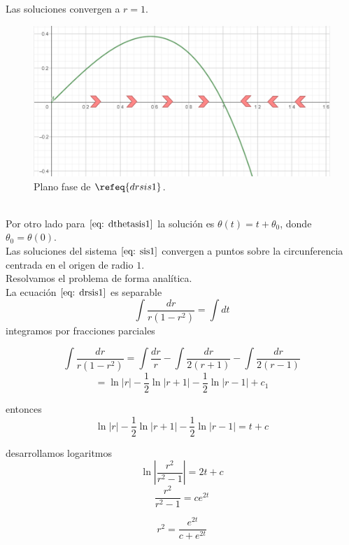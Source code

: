 \documentclass[12pt, a4paper]{report}
\begin{document}
Las soluciones convergen a $r=1$.
\begin{figure}[h]
	\centering
	\includegraphics[width=14cm]{rej1.png}
	\caption{Plano fase de $\refeq{drsis1}$.}
\end{figure}\\

Por otro lado para $\eqref{eq: dthetasis1}$ la solución es $\theta(t)=t+\theta_0$,
donde $\theta_0=\theta(0)$.\\

Las soluciones del sistema $\eqref{eq: sis1}$ convergen a puntos sobre la
circunferencia centrada en el origen de radio $1$.\\

Resolvamos el problema de forma analítica.\\

La ecuación $\eqref{eq: drsis1}$ es separable
$$\int\frac{dr}{r(1-r^2)}=\int dt$$
integramos por fracciones parciales

$$\int\frac{dr}{r(1-r^2)}=\int\frac{dr}{r}-\int\frac{dr}{2(r+1)}-\int\frac{dr}{2(r-1)}$$
$$=\ln |r|-\frac{1}{2}\ln|r+1|-\frac{1}{2}\ln|r-1|+c_1$$

entonces
$$\ln |r|-\frac{1}{2}\ln|r+1|-\frac{1}{2}\ln|r-1|=t+c$$

desarrollamos logaritmos
$$\ln\left\lvert\frac{r^2}{r^2-1}\right\rvert=2t+c$$
$$\frac{r^2}{r^2-1}=ce^{2t}$$

$$r^2=\frac{e^{2t}}{c+e^{2t}}$$
\end{document}
